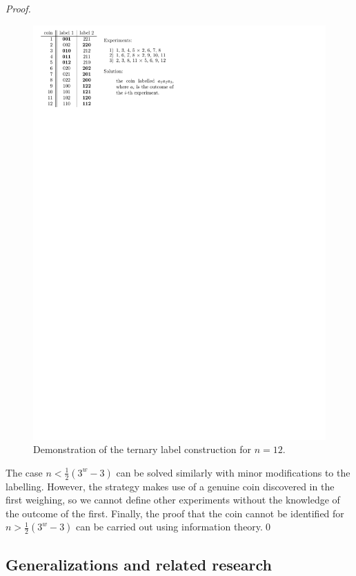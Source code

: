 \begin{proof}
\begin{figure}[h]
\begin{center}
\includegraphics{pictures/coins12-th.pdf}
\end{center}
\caption{Demonstration of the ternary label construction for $n=12$.}
\label{fig:coins12scheme}
\end{figure}

The case $n < \frac{1}{2}(3^w - 3)$ can be solved similarly with minor modifications
  to the labelling.
However, the strategy makes use of a genuine coin discovered in the first
  weighing, so we cannot define other experiments without the knowledge
  of the outcome of the first.
Finally, the proof that the coin cannot be identified for
  $n > \frac{1}{2}(3^w - 3)$ can be carried out using information theory.\qed
\end{proof}

\subsection{Generalizations and related research}

